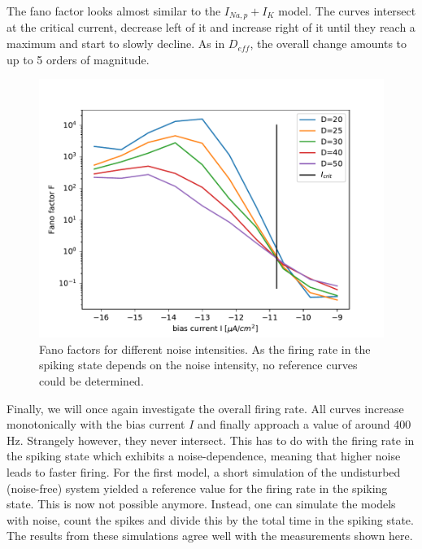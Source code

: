 \documentclass[12pt,a4paper]{article}
\begin{document}
The fano factor looks almost similar to the $I_{Na,p}+I_K$ model. The curves intersect at the critical current, decrease left of it and increase right of it until they reach a maximum and start to slowly decline. As in $D_{eff}$, the overall change amounts to up to 5 orders of magnitude.
\begin{figure}[H]
	\centering
	\includegraphics[scale=1]{fneursinglecritrealrinzelrangelong26d1realrinzelrange26d1.pdf}\caption{Fano factors for different noise intensities. As the firing rate in the spiking state depends on the noise intensity, no reference curves could be determined.}
	\label{fanorinzel}
\end{figure}
Finally, we will once again investigate the overall firing rate. All curves increase monotonically with the bias current $I$ and finally approach a value of around 400 Hz. Strangely however, they never intersect. This has to do with the firing rate in the spiking state which exhibits a noise-dependence, meaning that higher noise leads to faster firing. For the first model, a short simulation of the undisturbed (noise-free) system yielded a reference value for the firing rate in the spiking state. This is now not possible anymore. Instead, one can simulate the models with noise, count the spikes and divide this by the total time in the spiking state. The results from these simulations agree well with the measurements shown here.
\end{document}
